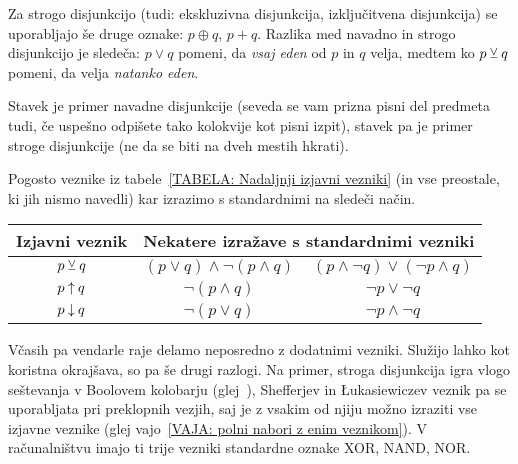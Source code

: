                 Za strogo disjunkcijo (tudi: ekskluzivna disjunkcija, izključitvena disjunkcija) se uporabljajo še druge oznake: $p \oplus q$, $p + q$. Razlika med navadno in strogo disjunkcijo je sledeča: $p \lor q$ pomeni, da \emph{vsaj eden} od $p$ in $q$ velja, medtem ko $p \mathbin{\veebar} q$ pomeni, da velja \emph{natanko eden}.

                \begin{zgled}
                        Stavek  je primer navadne disjunkcije (seveda se vam prizna pisni del predmeta tudi, če uspešno odpišete tako kolokvije kot pisni izpit), stavek  pa je primer stroge disjunkcije (ne da se biti na dveh mestih hkrati).
                \end{zgled}

                Pogosto veznike iz tabele~\ref{TABELA: Nadaljnji izjavni vezniki} (in vse preostale, ki jih nismo navedli) kar izrazimo s standardnimi na sledeči način.
                \begin{center}
                        \begin{tabular}{|ccc|}
                                \hline
                                \textbf{Izjavni veznik} & \multicolumn{2}{c|}{\textbf{Nekatere izražave s standardnimi vezniki}} \\
                                \hline
                                $p \mathbin{\veebar} q$ & $(p \lor q) \land \lnot(p \land q)$ & $(p \land \lnot{q}) \lor (\lnot{p} \land q)$ \\
                                $p \mathbin{\uparrow} q$ & $\lnot(p \land q)$ & $\lnot{p} \lor \lnot{q}$ \\
                                $p \mathbin{\downarrow} q$ & $\lnot(p \lor q)$ & $\lnot{p} \land \lnot{q}$ \\
                                \hline
                        \end{tabular}
                \end{center}

                Včasih pa vendarle raje delamo neposredno z dodatnimi vezniki. Služijo lahko kot koristna okrajšava, so pa še drugi razlogi. Na primer, stroga disjunkcija igra vlogo seštevanja v Boolovem kolobarju (glej~), Shefferjev in Łukasiewiczev veznik pa se uporabljata pri preklopnih vezjih, saj je z vsakim od njiju možno izraziti vse izjavne veznike (glej vajo~\ref{VAJA: polni nabori z enim veznikom}). V računalništvu imajo ti trije vezniki standardne oznake XOR, NAND, NOR.

